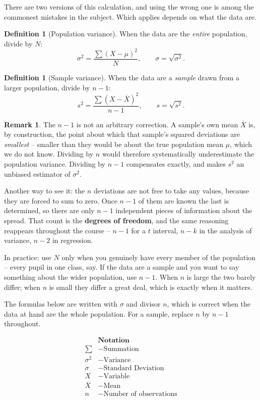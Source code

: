 \documentclass[11pt,a4paper]{article}
\theoremstyle{definition}
\newtheorem{definition}[thm]{Definition}
\newtheorem{remark}[thm]{Remark}
\begin{document}
There are two versions of this calculation, and using the wrong one is among the commonest
mistakes in the subject. Which applies depends on what the data are.

\begin{definition}[Population variance]
When the data are the \emph{entire} population, divide by $N$:
\[\sigma^2=\frac{\sum (X-\mu)^2}{N},\qquad \sigma=\sqrt{\sigma^2}.\]
\end{definition}

\begin{definition}[Sample variance]
When the data are a \emph{sample} drawn from a larger population, divide by $n-1$:
\[s^2=\frac{\sum (X-\overline{X})^2}{n-1},\qquad s=\sqrt{s^2}.\]
\end{definition}

\begin{remark}
The $n-1$ is not an arbitrary correction. A sample's own mean $\overline{X}$ is, by
construction, the point about which that sample's squared deviations are \emph{smallest} --
smaller than they would be about the true population mean $\mu$, which we do not know.
Dividing by $n$ would therefore systematically underestimate the population variance.
Dividing by $n-1$ compensates exactly, and makes $s^2$ an unbiased estimator of $\sigma^2$.

Another way to see it: the $n$ deviations are not free to take any values, because they are
forced to sum to zero. Once $n-1$ of them are known the last is determined, so there are
only $n-1$ independent pieces of information about the spread. That count is the
\textbf{degrees of freedom}, and the same reasoning reappears throughout the course --
$n-1$ for a $t$ interval, $n-k$ in the analysis of variance, $n-2$ in regression.

In practice: use $N$ only when you genuinely have every member of the population -- every
pupil in one class, say. If the data are a sample and you want to say something about the
wider population, use $n-1$. When $n$ is large the two barely differ; when $n$ is small
they differ a great deal, which is exactly when it matters.
\end{remark}

The formulas below are written with $\sigma$ and divisor $n$, which is correct when the
data at hand are the whole population. For a sample, replace $n$ by $n-1$ throughout.

\begin{align*}
& \textbf{Notation}\\
\sum &- \text{Summation}\\
\sigma^2 &- \text{Variance}\\
\sigma &- \text{Standard Deviation}\\
X &- \text{Variable}\\
\overline{X} &- \text{Mean}\\
n &- \text{Number of observations}
\end{align*}
\end{document}
